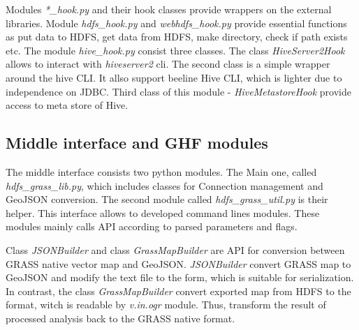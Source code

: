\documentclass[a4paper,12pt,oneside]{report}
\begin{document}
	Modules \textit{*\_hook.py} and their hook classes provide wrappers on the
	external libraries. Module \textit{hdfs\_hook.py} and \textit{webhdfs\_hook.py}
	provide essential functions as put data to HDFS, get data from HDFS, make
	directory, check if path exists etc. 
	The module \textit{ hive\_hook.py} consist three classes. The class
	\textit{HiveServer2Hook} allows to interact with \textit{hiveserver2} cli. The
	second class is a simple wrapper around the hive CLI. It allso support beeline
	Hive CLI, which is lighter due to independence on JDBC. Third class of this
	module -  \textit{HiveMetastoreHook} provide access to meta store of Hive. 
	
	\subsection{Middle interface and GHF modules}
	The middle interface consists two python modules. The Main one, called
	\textit{hdfs\_grass\_lib.py}, which includes classes for Connection management
	and GeoJSON conversion.  The second module called \textit{hdfs\_grass\_util.py}
	is their helper. This interface allows to developed command lines
	modules. These modules mainly calls API according to parsed parameters and flags.  
	
	Class \textit{JSONBuilder} and class \textit{GrassMapBuilder} are API for
	conversion between GRASS native vector map and GeoJSON.  \textit{JSONBuilder}
	convert GRASS map to GeoJSON and modify the text file to the form, which is
	suitable for serialization. In contrast, the class \textit{GrassMapBuilder}
	convert exported map from HDFS to the format, witch is readable by
	\textit{v.in.ogr} module. Thus, transform the result of processed analysis back
	to the GRASS native format.
	
\end{document}
